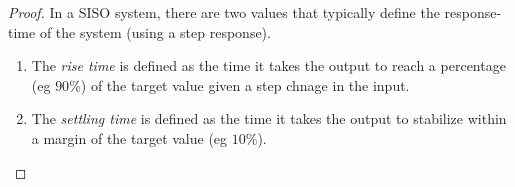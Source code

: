 \documentclass[sigconf]{llncs}
\begin{document}
\begin{proof}
In a SISO system, there are two values that typically define the
response-time of the system (using a step response).
%
\begin{enumerate}
\item The \emph{rise time} is defined as the time it takes the output to reach a percentage (eg $90\%$) of the target value given a step chnage in the input.
\item The \emph{settling time} is defined as the time it takes the output to stabilize within a margin of the target value (eg $10\%$).
\end{enumerate} 
%


\end{proof}
\end{document}

